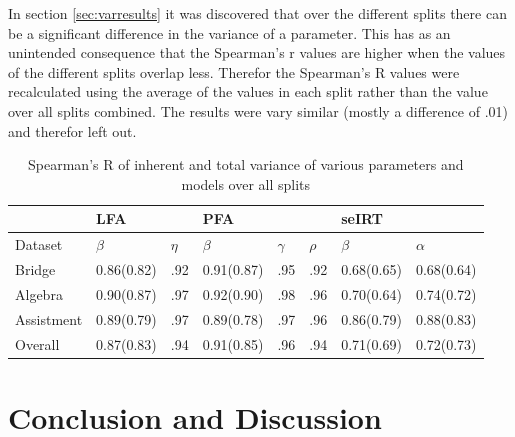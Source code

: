 \documentclass{scrartcl}
\begin{document}
In section \ref{sec:varresults} it was discovered that over the different splits there can be a significant difference in the variance of a parameter. This has as an unintended consequence that the Spearman's r values are higher when the values of the different splits overlap less. Therefor the Spearman's R values were recalculated using the average of the values in each split rather than the value over all splits combined. The results were vary similar (mostly a difference of .01) and therefor left out. 
\begin{center}
\begin{table}[!htbp]
\begin{tabular}{| l || l | l ||l|l |l||l|l|}

    \hline
     & LFA  & & PFA & & &seIRT &   \\ \hline
    Dataset & $\beta$ & $\eta$ & $\beta$ & $\gamma$ & $\rho$ & $\beta$ & $\alpha$  \\ \hline
    Bridge     & 0.86(0.82) & .92 & 0.91(0.87) & .95 & .92 & 0.68(0.65)&0.68(0.64) \\ \hline
    Algebra    & 0.90(0.87) & .97 & 0.92(0.90) & .98 & .96 & 0.70(0.64)&0.74(0.72) \\ \hline
    Assistment & 0.89(0.79) & .97 & 0.89(0.78) & .97 & .96 & 0.86(0.79)&0.88(0.83) \\ \hline \hline
    Overall    & 0.87(0.83) & .94 & 0.91(0.85) & .96 & .94 & 0.71(0.69)&0.72(0.73) \\
    \hline
\end{tabular}
\caption{Spearman's R of inherent and total variance of various parameters and models over all splits}
\label{tab:intorank}
\end{table}
\end{center}

\newpage
\section{Conclusion and Discussion}
\end{document}
